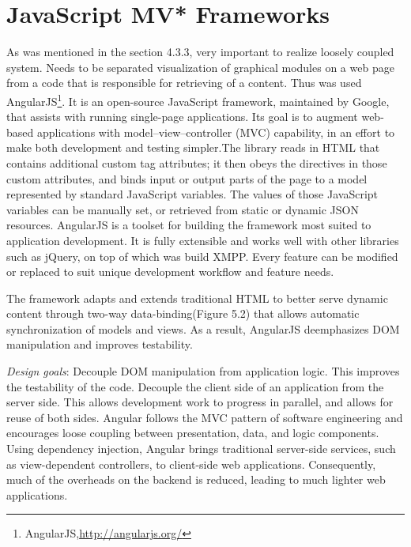 \section{JavaScript MV* Frameworks}
	As was mentioned in the section 4.3.3, very important to realize loosely coupled system. Needs to be separated visualization of graphical modules on a web page from a code that is responsible for retrieving of a content. Thus was used AngularJS\footnote{AngularJS,\url{http://angularjs.org/}}. It is an open-source JavaScript framework, maintained by Google, that assists with running single-page applications. Its goal is to augment web-based applications with model–view–controller (MVC) capability, in an effort to make both development and testing simpler.The library reads in HTML that contains additional custom tag attributes; it then obeys the directives in those custom attributes, and binds input or output parts of the page to a model represented by standard JavaScript variables. The values of those JavaScript variables can be manually set, or retrieved from static or dynamic JSON resources\cite{ wiki:angular}. AngularJS is a toolset for building the framework most suited to application development. It is fully extensible and works well with other libraries such as jQuery, on top of which was build XMPP. Every feature can be modified or replaced to suit unique development workflow and feature needs.

    The framework adapts and extends traditional HTML to better serve dynamic content through two-way data-binding(Figure 5.2) that allows automatic synchronization of models and views. As a result, AngularJS deemphasizes DOM manipulation and improves testability.

	\emph{Design goals}:
	\newline
	Decouple DOM manipulation from application logic. This improves the testability of the code. Decouple the client side of an application from the server side. This allows development work to progress in parallel, and allows for reuse of both sides.	Angular follows the MVC pattern of software engineering and encourages loose coupling between presentation, data, and logic components. Using dependency injection, Angular brings traditional server-side services, such as view-dependent controllers, to client-side web applications. Consequently, much of the overheads on the backend is reduced, leading to much lighter web applications.

